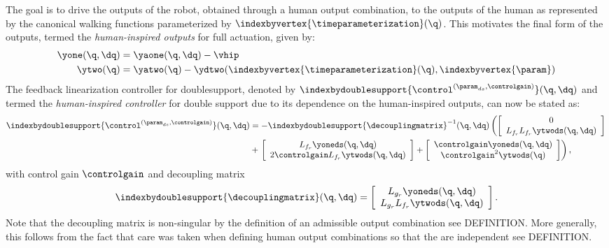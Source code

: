  The goal is to drive the outputs of the robot, obtained through a human output combination, to the outputs of the human as represented by the canonical walking functions parameterized by $\indexbyvertex{\timeparameterization}(\q)$. This motivates the final form of the outputs, termed the \textit{human-inspired outputs} for full actuation, given by:
\begin{align}
 \yone(\q,\dq) &= \yaone(\q,\dq) -\vhip\\
 \ytwo(\q) &= \yatwo(\q) - \ydtwo(\indexbyvertex{\timeparameterization}(\q), \indexbyvertex{\param})
\end{align}
The feedback linearization controller for doublesupport, denoted by $\indexbydoublesupport{\control^{(\param_{ds},\controlgain)}}(\q,\dq)$ and termed the \textit{human-inspired controller} for double support due to its dependence on the human-inspired outputs, can now be stated as:
\begin{align}
 \indexbydoublesupport{\control^{(\param_{ds},\controlgain)}}(\q,\dq)& = -\indexbydoublesupport{\decouplingmatrix}^{-1}(\q,\dq)  \left( \left[ \begin{array}{c} 0 \\ L_{f_r}L_{f_r}\ytwods(\q, \dq) \end{array} \right]\right.  \\ &+ \left.\left[ \begin{array}{c} L_{f_r}\yoneds(\q, \dq) \\ 2 \controlgain L_{f_r}\ytwods(\q, \dq) \end{array} \right] + \left[ \begin{array}{c} \controlgain \yoneds(\q,\dq) \\ \controlgain^2 \ytwods(\q) \end{array} \right] \right),
 \nonumber
\end{align}
with control gain $\controlgain$ and decoupling matrix
\begin{align}
 \indexbydoublesupport{\decouplingmatrix}(\q,\dq) = \left[ \begin{array}{c} L_{g_r}\yoneds(\q, \dq) \\ L_{g_r}L_{f_r}\ytwods(\q, \dq) \end{array} \right].
\end{align}
Note that the decoupling matrix is non-singular by the definition of an admissible output combination see DEFINITION. More generally, this follows from the fact that care was taken when defining human output combinations so that the are independent see DEFINITION.

